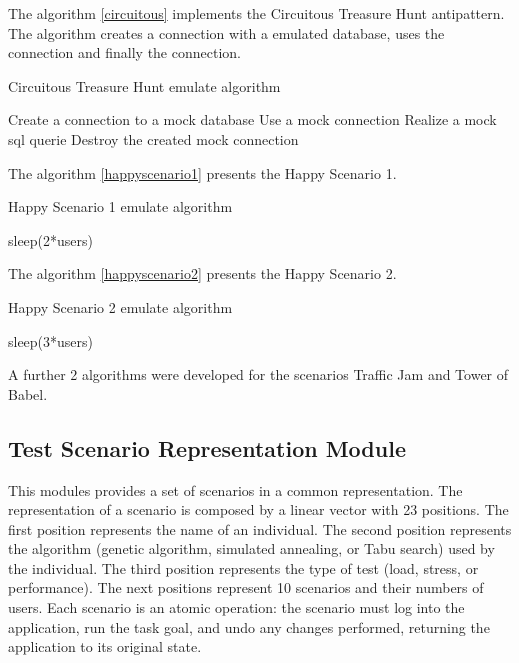 \documentclass[times]{stvrauth}
\begin{document}
The algorithm \ref{circuitous} implements the Circuitous Treasure Hunt antipattern. The algorithm creates a connection with a emulated database, uses the connection and finally the connection.

\begin{algorithm}[H]
  \caption{Circuitous Treasure Hunt emulate algorithm}
  \label{circuitous}
  \begin{algorithmic}[1]
    
        \State Create a connection to a mock  database
        \State Use a mock connection
        \State Realize a mock sql querie
        \State Destroy the created mock connection     
        \EndFor
    \EndFor
      
  \end{algorithmic}
\end{algorithm}

The algorithm \ref{happyscenario1} presents the Happy Scenario 1. 

\begin{algorithm}[H]
  \caption{Happy Scenario 1 emulate algorithm}\label{happyscenario1}
  \begin{algorithmic}[1]
    \State sleep(2*users)   
  \end{algorithmic}
\end{algorithm}

The algorithm \ref{happyscenario2} presents the Happy Scenario 2. 

\begin{algorithm}[H]
  \caption{Happy Scenario 2 emulate algorithm}\label{happyscenario2}
  \begin{algorithmic}[1]
    \State sleep(3*users)   
  \end{algorithmic}
\end{algorithm}

A further 2 algorithms were developed for the scenarios Traffic Jam and Tower of Babel.

\subsection{Test Scenario Representation Module}

This modules provides a set of scenarios in a common representation. The representation of a scenario is composed by a linear vector with 23 positions. The first position represents the name of an individual. The second position represents the algorithm (genetic algorithm, simulated annealing, or Tabu search) used by the individual. The third position represents the type of test (load, stress, or performance). The next positions represent 10 scenarios and their numbers of users. Each scenario is an atomic operation: the scenario must log into the application, run the task goal, and undo any changes performed, returning the application to its original state.
\end{document}
